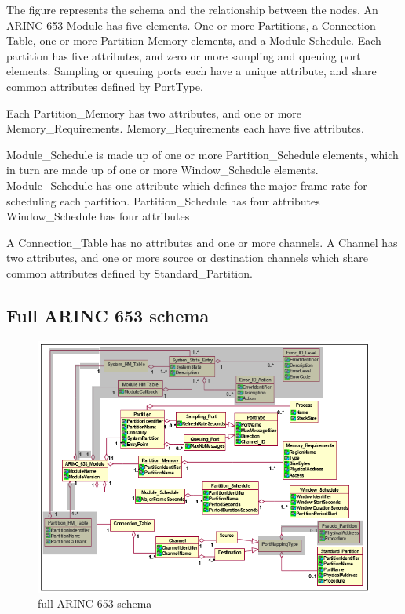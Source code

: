 The figure represents the schema and the relationship between the nodes. An ARINC 653 Module has five elements. One or more Partitions, a Connection Table, one or more Partition Memory elements, and a Module Schedule.
Each partition has five attributes, and zero or more sampling and queuing port elements. 
Sampling or queuing ports each have a unique attribute, and share common attributes defined by PortType.  

Each Partition\_Memory has two attributes, and one or more Memory\_Requirements.
Memory\_Requirements each have five attributes.

Module\_Schedule is made up of one or more Partition\_Schedule elements, which in turn are made up of one or more Window\_Schedule elements. Module\_Schedule has one attribute which defines the major frame rate for scheduling each partition. 
Partition\_Schedule has four attributes
Window\_Schedule has four attributes

A Connection\_Table has no attributes and one or more channels.
A Channel has two attributes, and one or more source or destination channels which share common attributes defined by Standard\_Partition.  

\subsection{Full ARINC 653 schema}

\begin{figure}[H]
	\includegraphics{figures/originalschema.png}
	\caption{full ARINC 653 schema}
	\label{fig:arinc653schema}
\end{figure}

